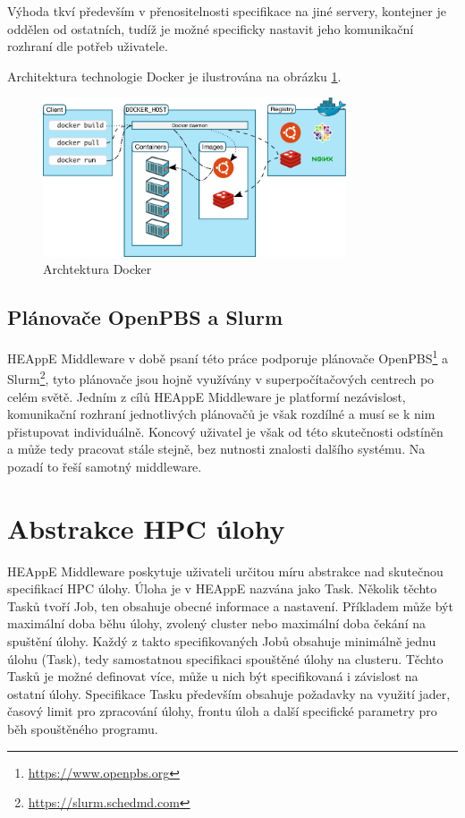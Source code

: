 Výhoda tkví především v přenositelnosti specifikace na jiné servery, kontejner je oddělen od ostatních, tudíž je možné specificky nastavit jeho komunikační rozhraní dle potřeb uživatele.

Architektura technologie Docker je ilustrována na obrázku \ref{fig:docker-architecture}.

\begin{figure}[!h]
	\centering
	\includegraphics[width=0.8\textwidth]{Figures/docker-architecture.png}
	\caption{Archtektura Docker \cite{Ued4tuEOQL0cOIeN}}
	\label{fig:docker-architecture}
\end{figure}

\subsection{Plánovače OpenPBS a Slurm}\label{subsection:heappe-support-schedulers}
HEAppE Middleware v době psaní této práce podporuje plánovače OpenPBS\footnote{\href{https://www.openpbs.org}{https://www.openpbs.org}} a Slurm\footnote{\href{https://slurm.schedmd.com}{https://slurm.schedmd.com}}, tyto plánovače jsou hojně využívány v superpočítačových centrech po celém světě. Jedním z cílů HEAppE Middleware je platformí nezávislost, komunikační rozhraní jednotlivých plánovačů je však rozdílné a musí se k nim přistupovat individuálně. Koncový uživatel je však od této skutečnosti odstíněn \\a může tedy pracovat stále stejně, bez nutnosti znalosti dalšího systému. Na pozadí to řeší samotný middleware.


\section{Abstrakce HPC úlohy}
HEAppE Middleware poskytuje uživateli určitou míru abstrakce nad skutečnou specifikací HPC úlohy. Úloha je v HEAppE nazvána jako Task. Několik těchto Tasků tvoří Job, ten obsahuje obecné informace a nastavení. Příkladem může být maximální doba běhu úlohy, zvolený cluster nebo maximální doba čekání na spuštění úlohy. Každý z takto specifikovaných Jobů obsahuje minimálně jednu úlohu (Task), tedy samostatnou specifikaci spouštěné úlohy na clusteru. Těchto Tasků je možné definovat více, může u nich být specifikovaná i závislost na ostatní úlohy. Specifikace Tasku především obsahuje požadavky na využití jader, časový limit pro zpracování úlohy, frontu úloh a další specifické parametry pro běh spouštěného programu.

